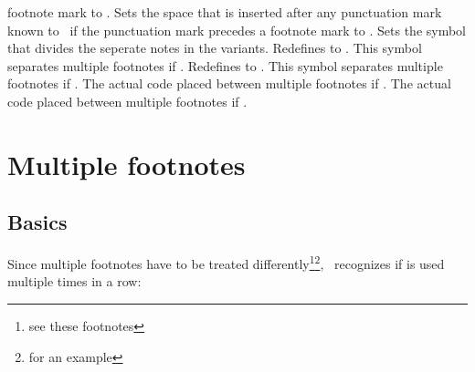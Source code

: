 \documentclass{fnpct-manual}
\begin{document}
\begin{options}
    footnote mark to .
    Sets the space that is inserted after any punctuation mark known to
    \fnpct\ if the punctuation mark precedes a footnote mark to
    .
  \Default{\code{;}}
    Sets the symbol that divides the seperate notes in the 
    variants.
    Redefines  to .  This symbol separates
    multiple footnotes if .
  \Default{\code{--}}
    Redefines  to .  This symbol separates
    multiple footnotes if .
    The actual code placed between multiple footnotes if .
    The actual code placed between multiple footnotes if .
\end{options}



\section{Multiple footnotes}\label{sec:multiple}
\subsection{Basics}
Since multiple footnotes have to be treated differently\footnote{see these
  footnotes}\footnote{for an example}, \fnpct\ recognizes if  is
used multiple times in a row:
\end{document}
